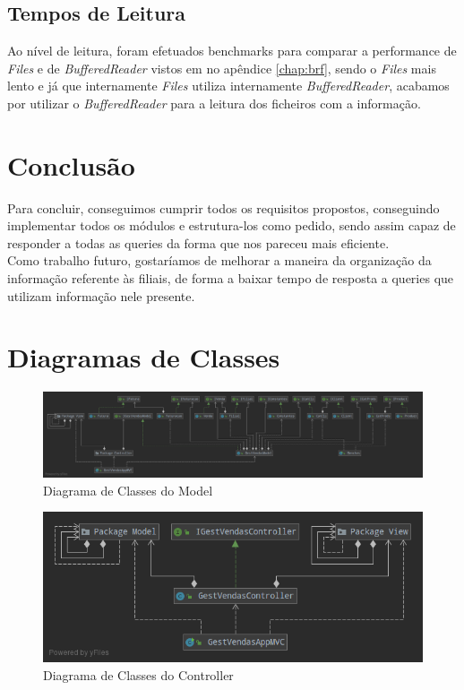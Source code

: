 \documentclass[a4paper]{report}
\begin{document}
\section{Tempos de Leitura}
Ao nível de leitura, foram efetuados benchmarks para comparar a performance de
\textit{Files} e de \textit{BufferedReader} vistos em no apêndice \ref{chap:brf}, sendo o
\textit{Files} mais lento e já que internamente \textit{Files} utiliza internamente
\textit{BufferedReader}, acabamos por utilizar o \textit{BufferedReader} para a leitura
dos ficheiros com a informação.

\chapter{Conclusão}

Para concluir, conseguimos cumprir todos os requisitos propostos, conseguindo implementar
todos os módulos e estrutura-los como pedido, sendo assim capaz de responder a todas as 
queries da forma que nos pareceu mais eficiente.\\
Como trabalho futuro, gostaríamos de melhorar a maneira da organização da informação 
referente às filiais, de forma a baixar tempo de resposta a queries que utilizam informação
nele presente.

\appendix

\chapter{Diagramas de Classes}
\begin{figure}[H]
    \begin{center}
        \includegraphics[width=1\textwidth]{modelGraph.png}\par
        \caption{Diagrama de Classes do Model}
    \end{center}
\end{figure}

\begin{figure}[H]
    \begin{center}
        \includegraphics[width=1\textwidth]{viewGraph.png}\par
        \caption{Diagrama de Classes do Controller}
    \end{center}
\end{figure}
\end{document}
